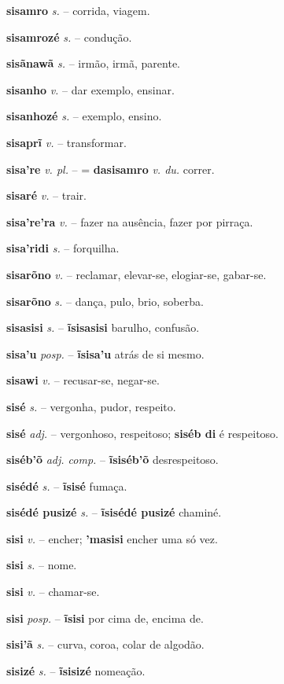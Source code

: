 \textbf{sisamro} \textit{s.} -- corrida, viagem.

\textbf{sisamrozé} \textit{s.} -- condução.

\textbf{sisãnawã} \textit{s.} -- irmão, irmã, parente.

\textbf{sisanho} \textit{v.} -- dar exemplo, ensinar.

\textbf{sisanhozé} \textit{s.} -- exemplo, ensino.

\textbf{sisaprĩ} \textit{v.} -- transformar.

\textbf{sisa're} \textit{v. pl.} -- = \textbf{dasisamro} \textit{v. du.} correr.

\textbf{sisaré} \textit{v.} -- trair.

\textbf{sisa're'ra} \textit{v.} -- fazer na ausência, fazer por pirraça.

\textbf{sisa'ridi} \textit{s.} -- forquilha.

\textbf{sisarõno} \textit{v.} -- reclamar, elevar-se, elogiar-se, gabar-se.

\textbf{sisarõno} \textit{s.} -- dança, pulo, brio, soberba.

\textbf{sisasisi} \textit{s.} -- \textbf{ĩsisasisi} barulho, confusão.

\textbf{sisa'u} \textit{posp.} -- \textbf{ĩsisa'u} atrás de si mesmo.

\textbf{sisawi} \textit{v.} -- recusar-se, negar-se.

\textbf{sisé} \textit{s.} -- vergonha, pudor, respeito.

\textbf{sisé} \textit{adj.} -- vergonhoso, respeitoso; \textbf{siséb di} é respeitoso.

\textbf{siséb'õ} \textit{adj. comp.} -- \textbf{ĩsiséb'õ} desrespeitoso.

\textbf{sisédé} \textit{s.} -- \textbf{ĩsisé} fumaça.

\textbf{sisédé pusizé} \textit{s.} -- \textbf{ĩsisédé pusizé} chaminé.

\textbf{sisi} \textit{v.} -- encher; \textbf{'masisi} encher uma só vez.

\textbf{sisi} \textit{s.} -- nome.

\textbf{sisi} \textit{v.} -- chamar-se.

\textbf{sisi} \textit{posp.} -- \textbf{ĩsisi} por cima de, encima de.

\textbf{sisi'ã} \textit{s.} -- curva, coroa, colar de algodão.

\textbf{sisizé} \textit{s.} -- \textbf{ĩsisizé} nomeação.

